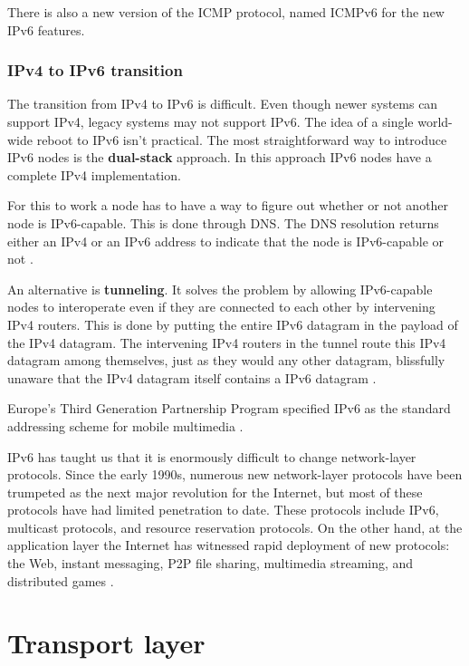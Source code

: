 There is also a new version of the ICMP protocol, named ICMPv6 for the new IPv6 features.

\subsubsection{IPv4 to IPv6 transition}

The transition from IPv4 to IPv6 is difficult. Even though newer systems can support IPv4, legacy systems may not support IPv6. The idea of a single world-wide reboot to IPv6 isn't practical. The most straightforward way to introduce IPv6 nodes is the \textbf{dual-stack} approach. In this approach IPv6 nodes have a complete IPv4 implementation.

For this to work a node has to have a way to figure out whether or not another node is IPv6-capable. This is done through DNS. The DNS resolution returns either an IPv4 or an IPv6 address to indicate that the node is IPv6-capable or not \cite[p.~360]{computer-networking-kurose-2012}.

An alternative is \textbf{tunneling}. It solves the problem by allowing IPv6-capable nodes to interoperate even if they are connected to each other by intervening IPv4 routers. This is done by putting the entire IPv6 datagram in the payload of the IPv4 datagram. The intervening IPv4 routers in the tunnel route this IPv4 datagram among themselves, just as they would any other datagram, blissfully unaware that the IPv4 datagram itself contains a IPv6 datagram \cite[p.~360]{computer-networking-kurose-2012}.

Europe's Third Generation Partnership Program specified IPv6 as the standard addressing scheme for mobile multimedia \cite[p.~362]{computer-networking-kurose-2012}.

IPv6 has taught us that it is enormously difficult to change network-layer protocols. Since the early 1990s, numerous new network-layer protocols have been trumpeted as the next major revolution for the
Internet, but most of these protocols have had limited penetration to date.
These protocols include IPv6, multicast protocols, and resource reservation protocols.
On the other hand, at the application layer the Internet has witnessed rapid deployment of new protocols: the Web, instant messaging, P2P file sharing, multimedia streaming, and distributed games \cite[p.~362]{computer-networking-kurose-2012}.

\section{Transport layer}

